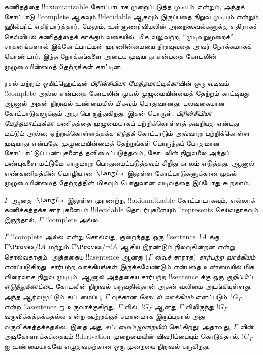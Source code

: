 \documentclass[../../../include/open-logic-section]{subfiles}
\begin{document}



கணிதத்தை !!{axiomatizable} கோட்பாடாக முறைப்படுத்த முடியும் என்றும், அந்தக்
கோட்பாடு !!{complete} ஆகவும் !!{decidable} ஆகவும் இருப்பதை நிறுவ முடியும்
என்றும் ஹில்பர்ட் எதிர்பார்த்தார். மேலும், உள்ளுணர்வியலின் அறைகூவல்களுக்கு
எதிராகச் செவ்வியல் கணிதத்தைக் காக்கும் வகையில், மிக வலுவற்ற,
``முடிவுறுமுறைச்'' சாதனங்களால் இக்கோட்பாட்டின் முரணின்மையை நிறுவுவதை அவர்
நோக்கமாகக் கொண்டார். இந்த நோக்கங்களை அடைய முடியாது என்பதை கோடலின்
முழுமையின்மைத் தேற்றங்கள் காட்டின.

ரசல் மற்றும் ஒயிட்ஹெட்டின் \emph{பிரின்சிபியா மேத்தமாட்டிக்கா}வின் ஒரு
வடிவம் !!{complete} அல்ல என்பதை கோடலின் முதல் முழுமையின்மைத் தேற்றம்
காட்டியது. ஆனால் அதன் நிறுவல் உண்மையில் மிகவும் பொதுவானது; பலவகையான
கோட்பாடுகளுக்கும் அது பொருந்துகிறது. இதன் பொருள்,
\emph{பிரின்சிபியா மேத்தமாட்டிக்கா} கணிதத்தை முழுமையாகப் பற்றிக்கொள்ளத்
தவறியது என்பது மட்டும் அல்ல; ஏற்றுக்கொள்ளத்தக்க \emph{எந்தக்} கோட்பாடும்
அவ்வாறு பற்றிக்கொள்ள முடியாது என்பதே. முழுமையின்மைத் தேற்றங்கள் பொருந்தப்
போதுமான கோட்பாட்டுப் பண்புகளைத் தனிமைப்படுத்தவும், கோடலின் நிறுவலை அந்தப்
பண்புகளை மட்டுமே சாருமாறு பொதுமைப்படுத்தவும் சிறிது காலம் எடுத்தது. ஆனால்
எண்கணிதத்தின் மொழியான~$\Lang L_A$ இலுள்ள கோட்பாடுகளுக்கான முதல்
முழுமையின்மைத் தேற்றத்தின் மிகவும் பொதுவான வடிவத்தை இப்போது கூறலாம்.

\begin{thm}
$\Gamma$ ஆனது~$\Lang L_A$ இலுள்ள முரணற்ற, !!{axiomatizable} கோட்பாடாகவும்,
எல்லாக் கணிக்கத்தக்க சார்புகளையும் !!{decidable} தொடர்புகளையும்
!!{represents} செய்வதாகவும் இருந்தால், $\Gamma$ !!{complete} அல்ல.
\end{thm}

$\Gamma$ !!{complete} அல்ல என்று சொல்வது, குறைந்தது ஒரு
!!{sentence}~$!A$ க்கு $\Gamma \Proves/ !A$ மற்றும் $\Gamma \Proves/
\lnot !A$ ஆகிய இரண்டும் நிலவுகின்றன என்று சொல்வதாகும். அத்தகைய
!!a{sentence} ஆனது ($\Gamma$ வைச் சாராத) \emph{சார்பற்ற வாக்கியம்}
எனப்படுகிறது. சார்பற்ற வாக்கியங்கள் இருக்கவேண்டும் என்பதை உண்மையில் மிக
விரைவாக நிறுவ முடியும். ஆனால் அத்தகைய சார்பற்ற !!{sentence} க்கு ஒரு
\emph{குறிப்பிட்ட எடுத்துக்காட்டை} கோடலின் நிறுவல் தருவதில்தான் அதன் வலிமை
அடங்கியுள்ளது. அந்த ஆர்வமூட்டும் கட்டமைப்பு, $\Gamma$ வுக்கான
\emph{கோடல் வாக்கியம்} எனப்படும்~$!G_\Gamma$ என்ற !!a{sentence} ஐ
உருவாக்குகிறது. $\Gamma$ வில், $!G_\Gamma$ ஆனது $\Gamma$ விலிருந்து
$!G_\Gamma$ வருவிக்கத்தக்கதல்ல என்ற கூற்றுக்குச் சமானமாக இருப்பதால் அது
வருவிக்கத்தக்கதல்ல. இதை அது \emph{கட்டமைப்புமுறையில்} செய்கிறது: அதாவது,
$\Gamma$ வின் அடிகோளாக்கத்தையும் !!{derivation} முறைமையின் விவரிப்பையும்
கொடுத்தால், $!G_\Gamma$ ஐ உண்மையாகவே எழுதுவதற்கான ஒரு முறையை நிறுவல்
தருகிறது.
\end{document}

